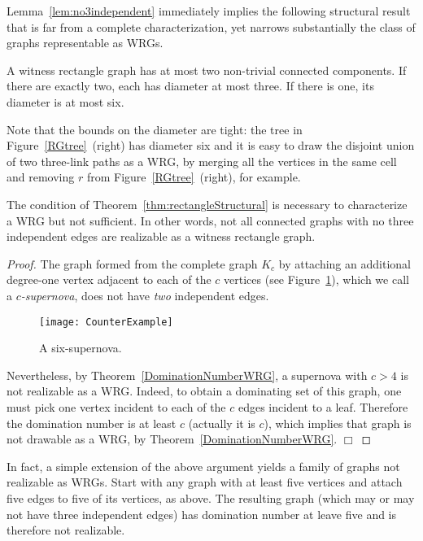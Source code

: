 \documentclass{llncs}
\begin{document}
Lemma~\ref{lem:no3independent} immediately implies the following
structural result that is far from a complete characterization, yet
narrows substantially the class of graphs representable as WRGs.

\begin{theorem} \label{thm:rectangleStructural} A witness rectangle graph has at most two
  non-trivial connected components.  If there are exactly two, each
  has diameter at most three.  If there is one, its diameter is at
  most six.
\end{theorem}

Note that the bounds on the diameter are tight: the tree in
Figure~\ref{RGtree}~(right) has diameter six and it is easy to draw the
disjoint union of two three-link paths as a WRG, by merging all the vertices in the same cell and removing $r$ from  Figure~\ref{RGtree}~(right), for example.

\begin{corollary} 
The condition of Theorem~\ref{thm:rectangleStructural} is necessary to characterize a 
WRG but not sufficient. In other words, not all connected graphs with no three independent edges are realizable as a witness rectangle graph.
\end{corollary}
\begin{proof}
The graph formed from the complete graph $K_c$ by attaching an additional degree-one vertex adjacent to each of the $c$ vertices (see Figure~\ref{supernova}), which we call a \emph{$c$-supernova}, does not have \emph{two} independent edges.
\begin{figure}
\centering
\texttt{[image: CounterExample]}
\caption{A six-supernova.}
\label{supernova}
\end{figure}
Nevertheless, by Theorem~\ref{DominationNumberWRG}, a supernova with
$c > 4$ is not realizable as a WRG.  Indeed, to obtain a dominating
set of this graph, one must pick one vertex incident to each of the
$c$ edges incident to a leaf.  Therefore the domination number is at
least $c$ (actually it is $c$), which implies that graph is not
drawable as a WRG, by Theorem~\ref{DominationNumberWRG}.  \hfill
$\Box$
\end{proof}

In fact, a simple extension of the above argument yields a family of
graphs not realizable as WRGs.  Start with any graph with at least
five vertices and attach five edges to five of its vertices, as above.
The resulting graph (which may or may not have three independent
edges) has domination number at leave five and is therefore not
realizable.
\end{document}
